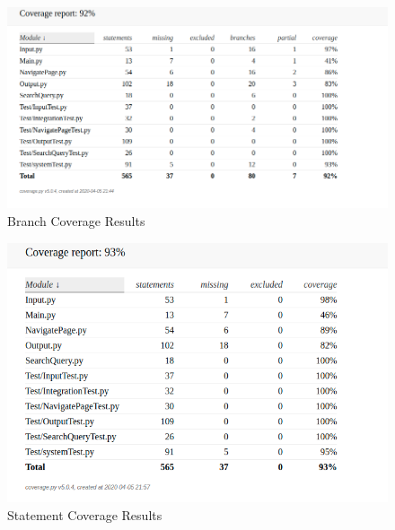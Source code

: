 \documentclass[12pt, titlepage]{article}
\begin{document}
\begin{figure}[htp]
    \centering
    \includegraphics[scale=0.5]{branch.png}
    \caption{Branch Coverage Results}
    \label{fig:Branch Coverage}
\end{figure}

\begin{figure}[htp]
    \centering
    \includegraphics[scale=0.5]{statement-coverage.png}
    \caption{Statement Coverage Results}
    \label{fig:Statement Coverage}
\end{figure}




\end{document}
